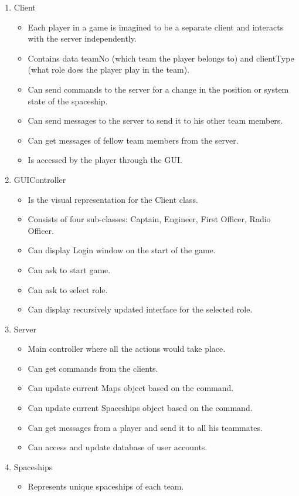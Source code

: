 \begin{enumerate}
\item Client
\begin{itemize}
\item Each player in a game is imagined to be a separate client and interacts with the server independently.
\item Contains data teamNo (which team the player belongs to) and clientType (what role does the player play in the team).
\item Can send commands to the server for a change in the position or system state of the spaceship.
\item Can send messages to the server to send it to his other team members.
\item Can get messages of fellow team members from the server.
\item Is accessed by the player through the GUI.
\end{itemize}
\item GUIController
\begin{itemize}
\item Is the visual representation for the Client class.
\item Consists of four sub-classes: Captain, Engineer, First Officer, Radio Officer.
\item Can display Login window on the start of the game.
\item Can ask to start game.
\item Can ask to select role.
\item Can display recursively updated interface for the selected role.
\end{itemize}
\item Server
\begin{itemize}
\item Main controller where all the actions would take place.
\item Can get commands from the clients.
\item Can update current Maps object based on the command.
\item Can update current Spaceships object based on the command.
\item Can get messages from a player and send it to all his teammates.
\item Can access and update database of user accounts.
\end{itemize}
\item Spaceships
\begin{itemize}
\item Represents unique spaceships of each team.

\end{itemize}
\end{enumerate}
